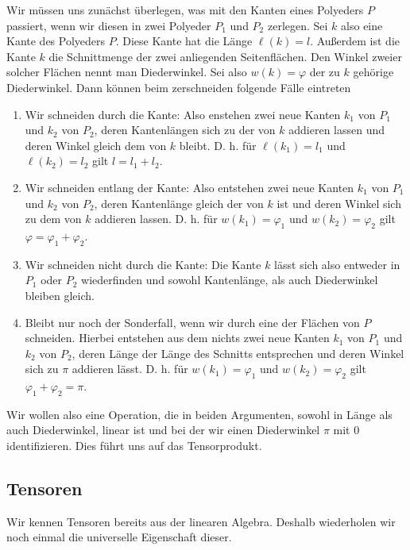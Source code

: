 \documentclass[11pt,titlepage]{article}
\theoremstyle{definition}
\theoremstyle{remark}
\begin{document}
	Wir müssen uns zunächst überlegen, was mit den Kanten eines Polyeders $P$ passiert, wenn wir diesen in zwei 
	Polyeder $P_1$ und $P_2$ zerlegen. Sei $k$ also eine Kante des Polyeders $P$. Diese Kante hat die Länge 
	$\ell(k)=l$. Außerdem ist die Kante $k$ die Schnittmenge der zwei anliegenden Seitenflächen. Den Winkel zweier 
	solcher Flächen nennt man Diederwinkel. Sei also $w(k)=\varphi$ der zu $k$ gehörige Diederwinkel. Dann können 
	beim zerschneiden folgende Fälle eintreten
	\begin{enumerate}
		\item \label{bem:dehn;1} 
		Wir schneiden durch die Kante: Also enstehen zwei neue Kanten $k_1$ von $P_1$ und $k_2$ von $P_2$, 
		deren Kantenlängen sich zu der von $k$ addieren lassen und deren Winkel gleich dem von $k$ bleibt. 
		D. h. für $\ell(k_1)=l_1$ und $\ell(k_2)=l_2$ gilt $l=l_1 +l_2$.
		\item \label{bem:dehn;2} 
		Wir schneiden entlang der Kante: Also entstehen zwei neue Kanten $k_1$ von $P_1$ und $k_2$ von 
		$P_2$, deren Kantenlänge gleich der von $k$ ist und deren Winkel sich zu dem von $k$ addieren lassen. 
		D. h. für $w(k_1)=\varphi_1$ und $w(k_2)=\varphi_2$ gilt $\varphi=\varphi_1 +\varphi_2$.
		\item \label{bem:dehn;3} 
		Wir schneiden nicht durch die Kante: Die Kante $k$ lässt sich also entweder in $P_1$ oder $P_2$ 
		wiederfinden und sowohl Kantenlänge, als auch Diederwinkel bleiben gleich.
		\item \label{bem:dehn;4} 
		Bleibt nur noch der Sonderfall, wenn wir durch eine der Flächen von $P$ schneiden. Hierbei entstehen 
		aus dem nichts zwei neue Kanten $k_1$ von $P_1$ und $k_2$ von $P_2$, deren Länge der Länge des 
		Schnitts entsprechen und deren Winkel sich zu $\pi$ addieren lässt. D. h. für $w(k_1)=\varphi_1$ und 
		$w(k_2)=\varphi_2$ gilt $\varphi_1 +\varphi_2 =\pi$.
	\end{enumerate}
	Wir wollen also eine Operation, die in beiden Argumenten, sowohl in Länge als auch Diederwinkel, linear ist 
	und bei der wir einen Diederwinkel $\pi$ mit $0$ identifizieren. Dies führt uns auf das Tensorprodukt.
	
	\subsection{Tensoren}
	
	Wir kennen Tensoren bereits aus der linearen Algebra. Deshalb wiederholen wir noch einmal die universelle 
	Eigenschaft dieser.
	
\end{document}
